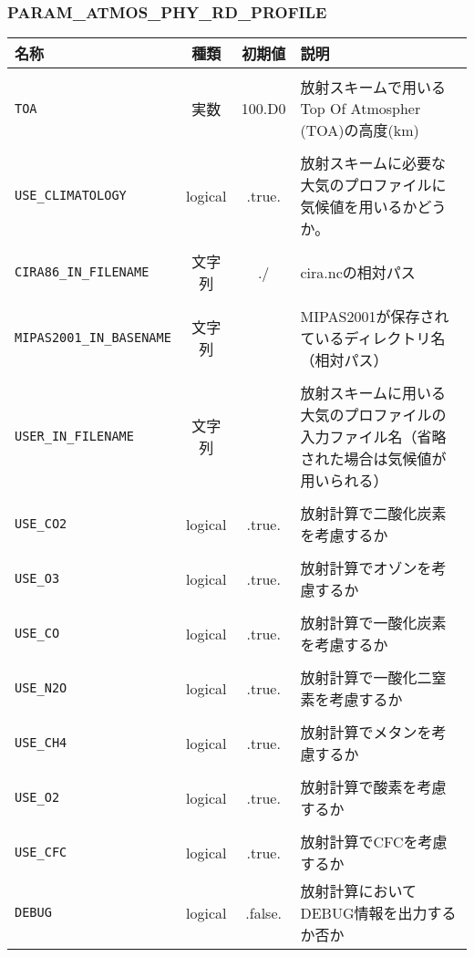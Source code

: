 \subsubsection{PARAM\_ATMOS\_PHY\_RD\_PROFILE}
\begin{tabularx}{150mm}{|l|c|c|X|} \hline
 \rowcolor[gray]{0.9} 名称 & 種類 & 初期値 & 説明 \\ \hline
 \shortstack{\verb|ATMOS_PHY_RD_PROFILE_|\\\verb|TOA|} & 実数 & 100.D0 & 放射スキームで用いるTop Of Atmospher (TOA)の高度(km) \\ \hline
 \shortstack{\verb|ATMOS_PHY_RD_PROFILE_|\\\verb|USE_CLIMATOLOGY|} & logical & .true. & 放射スキームに必要な大気のプロファイルに気候値を用いるかどうか。 \\ \hline
 \shortstack{\verb|ATMOS_PHY_RD_PROFILE_|\\\verb|CIRA86_IN_FILENAME|} & 文字列 & ./ & cira.ncの相対パス \\ \hline
 \shortstack{\verb|ATMOS_PHY_RD_PROFILE_|\\\verb|MIPAS2001_IN_BASENAME|} & 文字列 &  & MIPAS2001が保存されているディレクトリ名（相対パス） \\ \hline
 \shortstack{\verb|ATMOS_PHY_RD_PROFILE_|\\\verb|USER_IN_FILENAME|} & 文字列 &  & 放射スキームに用いる大気のプロファイルの入力ファイル名（省略された場合は気候値が用いられる） \\ \hline
 \shortstack{\verb|ATMOS_PHY_RD_PROFILE_|\\\verb|USE_CO2|} & logical & .true. & 放射計算で二酸化炭素を考慮するか \\ \hline
 \shortstack{\verb|ATMOS_PHY_RD_PROFILE_|\\\verb|USE_O3|} & logical & .true. & 放射計算でオゾンを考慮するか \\ \hline
 \shortstack{\verb|ATMOS_PHY_RD_PROFILE_|\\\verb|USE_CO|} & logical & .true. & 放射計算で一酸化炭素を考慮するか \\ \hline
 \shortstack{\verb|ATMOS_PHY_RD_PROFILE_|\\\verb|USE_N2O|} & logical & .true. & 放射計算で一酸化二窒素を考慮するか \\ \hline
 \shortstack{\verb|ATMOS_PHY_RD_PROFILE_|\\\verb|USE_CH4|} & logical & .true. & 放射計算でメタンを考慮するか \\ \hline
 \shortstack{\verb|ATMOS_PHY_RD_PROFILE_|\\\verb|USE_O2|} & logical & .true. & 放射計算で酸素を考慮するか \\ \hline
 \shortstack{\verb|ATMOS_PHY_RD_PROFILE_|\\\verb|USE_CFC|} & logical & .true. & 放射計算でCFCを考慮するか \\ \hline
 \verb|DEBUG| & logical & .false. & 放射計算においてDEBUG情報を出力するか否か \\ \hline
\end{tabularx}

